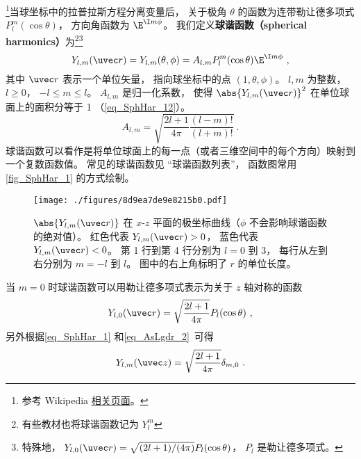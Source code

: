 

\footnote{参考 Wikipedia \href{https://en.wikipedia.org/wiki/Spherical_harmonics}{相关页面}。}当球坐标中的拉普拉斯方程分离变量后， 关于极角 $\theta$ 的函数为连带勒让德多项式 $P_l^m(\cos\theta)$， 方向角函数为 $\E^{\I m\phi}$。 我们定义\textbf{球谐函数（spherical harmonics）}为\footnote{有些教材也将球谐函数记为 $Y_l^m$}\footnote{特殊地， $Y_{l,0}(\uvec r) = \sqrt{(2l + 1)/(4\pi)}P_l(\cos\theta)$， $P_l$ 是勒让德多项式。}
\begin{equation}\label{eq_SphHar_1}
Y_{l, m} (\uvec r) = Y_{l, m}(\theta, \phi) = A_{l,m} P_l^m(\cos \theta) \E^{\I m\phi}~,
\end{equation}
其中 $\uvec r$ 表示一个单位矢量， 指向球坐标中的点 $(1, \theta, \phi)$。 $l, m$ 为整数， $l \geqslant 0$， $-l \leqslant m \leqslant l$。 $A_{l,m}$ 是归一化系数， 使得 $\abs{Y_{l, m} (\uvec r)}^2$ 在单位球面上的面积分等于 1 （\autoref{eq_SphHar_12}）。
\begin{equation}\label{eq_SphHar_2}
A_{l,m} =  \sqrt{\frac{2l + 1}{4\pi }\frac{(l - m)!}{(l + m)!}}~.
\end{equation}
球谐函数可以看作是将单位球面上的每一点（或者三维空间中的每个方向）映射到一个复数函数值。 常见的球谐函数见 “球谐函数列表”， 函数图常用\autoref{fig_SphHar_1} 的方式绘制。

\begin{figure}[ht]
\centering
\texttt{[image: ./figures/8d9ea7de9e8215b0.pdf]}
\caption{$\abs{Y_{l,m}(\uvec r)}$ 在 $x$-$z$ 平面的极坐标曲线（$\phi$ 不会影响球谐函数的绝对值）。 红色代表 $Y_{l,m}(\uvec r) > 0$， 蓝色代表 $Y_{l,m}(\uvec r) < 0$。 第 1 行到第 4 行分别为 $l = 0$ 到 $3$， 每行从左到右分别为 $m = -l$ 到 $l$。 图中的右上角标明了 $r$ 的单位长度。} \label{fig_SphHar_1}
\end{figure}

当 $m = 0$ 时球谐函数可以用勒让德多项式表示为关于 $z$ 轴对称的函数
\begin{equation}\label{eq_SphHar_11}
Y_{l,0}(\uvec r) = \sqrt{\frac{2l+1}{4\pi}} P_l(\cos\theta)~,
\end{equation}
另外根据\autoref{eq_SphHar_1} 和\autoref{eq_AsLgdr_2}~可得
\begin{equation}
Y_{l,m}(\uvec z) = \sqrt{\frac{2l+1}{4\pi}} \delta_{m,0}~.
\end{equation}

